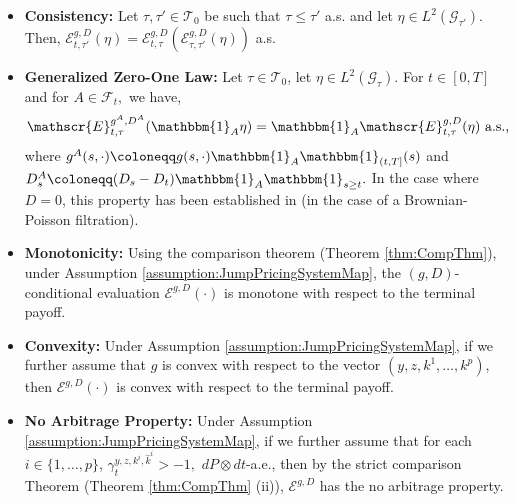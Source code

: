 \documentclass[11pt,a4paper]{article}
\numberwithin{equation}{section}
\theoremstyle{newPlain}
\theoremstyle{newDefinition}
\theoremstyle{newRemark}
\begin{document}
\begin{itemize}
    \item \textbf{Consistency:} Let $\tau,\tau'\in\mathcal{T}_0$ be such that $\tau\le\tau'$ a.s. and let $\eta\in L^2(\mathcal{G}_{\tau'})$. Then, $\mathscr{E}_{t,\tau'}^{g,D}(\eta) = \mathscr{E}_{t,\tau}^{g,D}(\mathscr{E}_{\tau,\tau'}^{g,D}(\eta))$ a.s.
    \item \textbf{Generalized Zero-One Law:} Let $\tau\in\mathcal{T}_0$, let  $\eta\in L^2(\mathcal{G}_\tau)$. For $t\in[0,T]$ and for  $A\in\mathcal{F}_t,$ we have,
    \begin{equation*}
        \mathscr{E}_{t,\tau}^{g^A,D^A}(\mathbbm{1}_{A}\eta) = \mathbbm{1}_{A}\mathscr{E}_{t,\tau}^{g,D}(\eta)\text{ a.s.,}
    \end{equation*}
    where $g^A(s,\cdot)\coloneqq g(s,\cdot)\mathbbm{1}_A\mathbbm{1}_{(t,T]}(s)$ and $D_s^A\coloneqq(D_s-D_t)\mathbbm{1}_A\mathbbm{1}_{s\ge t}.$   In the case where $D=0$, this property has been established  in \cite{grigorova2017optimal} (in the case of a Brownian-Poisson filtration). %
    \item \textbf{Monotonicity:} Using the comparison theorem (Theorem \ref{thm:CompThm}), under Assumption \ref{assumption:JumpPricingSystemMap}, the $(g,D)$-conditional evaluation $\mathscr{E}^{g,D}(\cdot)$ is monotone with respect to the terminal payoff. %
    \item \textbf{Convexity:} Under Assumption \ref{assumption:JumpPricingSystemMap}, if we further assume that $g$ is  convex  with respect to the vector $(y,z,k^1,\ldots,k^p)$, then $\mathscr{E}^{g,D}(\cdot)$ is convex with respect to the terminal payoff. %
    \item \textbf{No Arbitrage Property:} Under Assumption \ref{assumption:JumpPricingSystemMap}, if we  further assume that for each $i\in\{1,\ldots,p\}$, $\gamma_{t}^{y,z,k^i,\hat{k}^i}>-1,$ $dP\otimes dt$-a.e.,  then by the strict comparison Theorem (Theorem \ref{thm:CompThm} (ii)), $\mathscr{E}^{g,D}$ has the no arbitrage property.%

\end{itemize}
\end{document}
